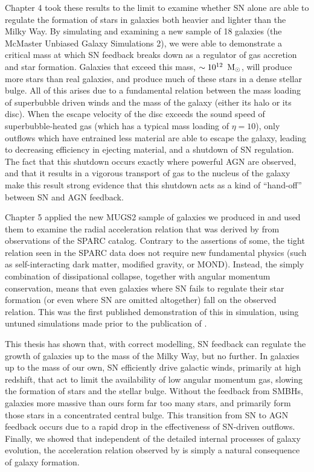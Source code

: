 Chapter 4 took these results to the limit to examine whether SN alone are able
to regulate the formation of stars in galaxies both heavier and lighter than the
Milky Way.  By simulating and examining a new sample of 18 galaxies (the
McMaster Unbiased Galaxy Simulations 2), we were able to demonstrate a critical
mass at which SN feedback breaks down as a regulator of gas accretion and star
formation.  Galaxies that exceed this mass, $\sim 10^{12}\;\>{\rm M_{\odot}}$, will produce
more stars than real galaxies, and produce much of these stars in a dense
stellar bulge.  All of this arises due to a fundamental relation between the
mass loading of superbubble driven winds and the mass of the galaxy (either its
halo or its disc).  When the escape velocity of the disc exceeds the sound speed
of superbubble-heated gas (which has a typical mass loading of $\eta=10$), only
outflows which have entrained less material are able to escape the galaxy,
leading to decreasing efficiency in ejecting material, and a shutdown of
SN regulation.  The fact that this shutdown occurs exactly where powerful AGN
are observed, and that it results in a vigorous transport of gas to the nucleus
of the galaxy make this result strong evidence that this shutdown acts as a kind
of ``hand-off'' between SN and AGN feedback.

Chapter 5 applied the new MUGS2 sample of galaxies we produced in
\citet{Keller2016a} and used them to examine the radial acceleration relation
that was derived by \citet{McGaugh2016} from observations of the SPARC
\citep{Lelli2016} catalog.  Contrary to the assertions of some, the tight
relation seen in the SPARC data does not require new fundamental physics (such
as self-interacting dark matter, modified gravity, or MOND).  Instead, the
simply combination of dissipational collapse, together with angular momentum
conservation, means that even galaxies where SN fails to regulate their star
formation (or even where SN are omitted altogether) fall on the observed
relation.  This was the first published demonstration of this in simulation,
using untuned simulations made prior to the publication of \citet{McGaugh2016}.

This thesis has shown that, with correct modelling, SN feedback can regulate the
growth of galaxies up to the mass of the Milky Way, but no further.  In galaxies
up to the mass of our own, SN efficiently drive galactic winds, primarily at
high redshift, that act to limit the availability of low angular momentum gas,
slowing the formation of stars and the stellar bulge. Without the
feedback from SMBHs, galaxies more massive than ours form far too many stars,
and primarily form those stars in a concentrated central bulge.  This transition
from SN to AGN feedback occurs due to a rapid drop in the effectiveness of
SN-driven outflows.  Finally, we showed that independent of the detailed
internal processes of galaxy evolution, the acceleration relation observed by
\citet{McGaugh2016} is simply a natural consequence of galaxy formation.

